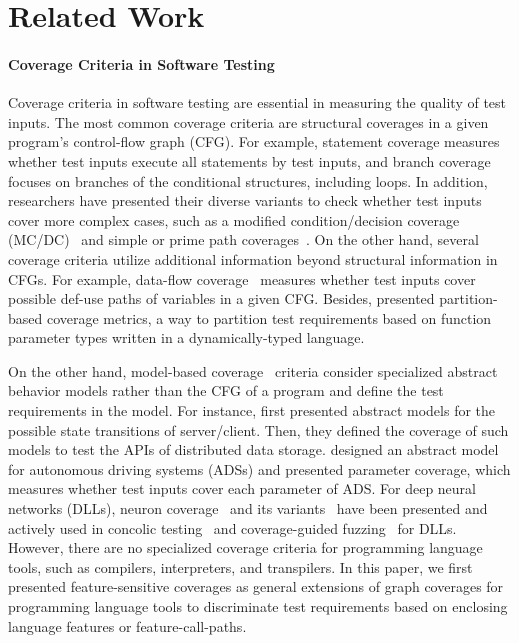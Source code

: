 \section{Related Work}\label{sec:related}

\paragraph{\textbf{Coverage Criteria in Software Testing}}
%
Coverage criteria in software testing are essential in measuring the quality of
test inputs.
%
The most common coverage criteria are structural coverages in a given program's
control-flow graph (CFG).
%
For example, statement coverage measures whether test inputs execute all
statements by test inputs, and branch coverage focuses on branches of the
conditional structures, including loops.
%
In addition, researchers have presented their diverse variants to check whether
test inputs cover more complex cases, such as a modified condition/decision
coverage (MC/DC)~\cite{cov-mcdc} and simple or prime path
coverages~\cite{cov-def}.
%
On the other hand, several coverage criteria utilize additional information
beyond structural information in CFGs.
%
For example, data-flow coverage~\cite{cov-dataflow} measures whether test inputs
cover possible def-use paths of variables in a given CFG.
%
Besides, \citet{cov-partition} presented partition-based coverage metrics, a way
to partition test requirements based on function parameter types written in a
dynamically-typed language.


On the other hand, model-based coverage~\cite{cov-model-book} criteria consider
specialized abstract behavior models rather than the CFG of a program and
define the test requirements in the model.
%
For instance, \citet{cov-model-api} first presented abstract models for the
possible state transitions of server/client.
%
Then, they defined the coverage of such models to test the APIs of distributed
data storage.
%
\citet{cov-param} designed an abstract model for autonomous driving systems
(ADSs) and presented parameter coverage, which measures whether test inputs
cover each parameter of ADS.
%
For deep neural networks (DLLs), neuron coverage~\cite{cov-neuron} and its
variants~\cite{cov-k-neuron} have been presented and actively used in concolic
testing~\cite{cov-concolic-dll} and coverage-guided
fuzzing~\cite{cov-fuzz-tensor, cov-fuzz-dl} for DLLs.
%
However, there are no specialized coverage criteria for programming language
tools, such as compilers, interpreters, and transpilers.
%
In this paper, we first presented feature-sensitive coverages as general
extensions of graph coverages for programming language tools to discriminate
test requirements based on enclosing language features or feature-call-paths.

